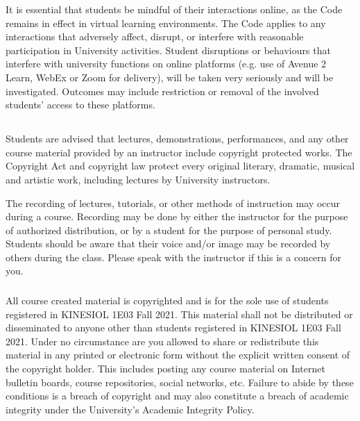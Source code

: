 \documentclass[hidelinks,11pt]{article}
\begin{document}
It is essential that students be mindful of their interactions online, as the Code remains in effect in virtual learning environments. The Code applies to any interactions that adversely affect, disrupt, or interfere with reasonable participation in University activities. Student disruptions or behaviours that interfere with university functions on online platforms (e.g. use of Avenue 2 Learn, WebEx or Zoom for delivery), will be taken very seriously and will be investigated. Outcomes may include restriction or removal of the involved students’ access to these platforms.

\subsection*{{}}
Students are advised that lectures, demonstrations, performances, and any other course material
provided by an instructor include copyright protected works. The Copyright Act and copyright law
protect every original literary, dramatic, musical and artistic work, including lectures by University
instructors. \medskip

The recording of lectures, tutorials, or other methods of instruction may occur during a course.
Recording may be done by either the instructor for the purpose of authorized distribution, or by a
student for the purpose of personal study. Students should be aware that their voice and/or image may
be recorded by others during the class. Please speak with the instructor if this is a concern for you.

\vspace{-1em}\subsubsection*{{}}
\vspace{-0.5em}All course created material is copyrighted and is for the sole use of students registered in KINESIOL 1E03 Fall 2021. This material shall not be distributed or disseminated to anyone other than students registered in KINESIOL 1E03 Fall 2021. Under no circumstance are you allowed to share or redistribute this material in any printed or electronic form without the explicit written consent of the copyright holder. This includes posting any course material on Internet bulletin boards, course repositories, social networks, etc. Failure to abide by these conditions is a breach of copyright and may also constitute a breach of academic integrity under the University’s Academic Integrity Policy.
\end{document}
